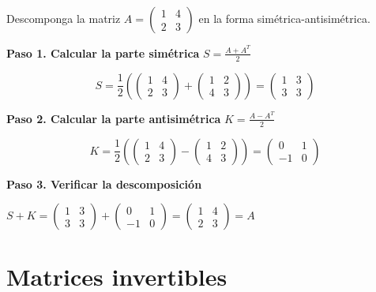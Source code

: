 \begin{example}
Descomponga la matriz $A = \begin{pmatrix} 1 & 4 \\ 2 & 3 \end{pmatrix}$ en la forma simétrica-antisimétrica.
\begin{myproof}
\textbf{Paso 1. Calcular la parte simétrica} $S = \frac{A + A^T}{2}$

\[
S = \frac{1}{2}\left( \begin{pmatrix} 1 & 4 \\ 2 & 3 \end{pmatrix} + \begin{pmatrix} 1 & 2 \\ 4 & 3 \end{pmatrix} \right) = \begin{pmatrix} 1 & 3 \\ 3 & 3 \end{pmatrix}
\]

\textbf{Paso 2. Calcular la parte antisimétrica} $K = \frac{A - A^T}{2}$

\[
K = \frac{1}{2}\left( \begin{pmatrix} 1 & 4 \\ 2 & 3 \end{pmatrix} - \begin{pmatrix} 1 & 2 \\ 4 & 3 \end{pmatrix} \right) = \begin{pmatrix} 0 & 1 \\ -1 & 0 \end{pmatrix}
\]

\textbf{Paso 3. Verificar la descomposición}

$S + K = \begin{pmatrix} 1 & 3 \\ 3 & 3 \end{pmatrix} + \begin{pmatrix} 0 & 1 \\ -1 & 0 \end{pmatrix} = \boxed{\begin{pmatrix} 1 & 4 \\ 2 & 3 \end{pmatrix} = A}$
\end{myproof}
\end{example}

\section{Matrices invertibles}

